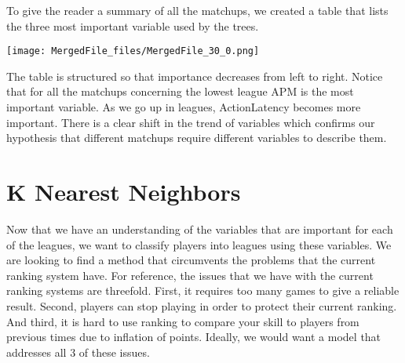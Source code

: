 \documentclass[letterpaper,10pt,english]{/usr/share/sphinx/texinputs/sphinxhowto}
\newenvironment{InvisibleVerbatim}
        {\begin{mdframed}[leftmargin=0.1\linewidth,innerleftmargin=3pt,innerrightmargin=3pt, userdefinedwidth=1\linewidth, linewidth=0pt, linecolor=white, usetwoside=false]}
        {\end{mdframed}}
\begin{document}
To give the reader a summary of all the matchups, we created a table
that lists the three most important variable used by the trees.

    

        
        

            
                \begin{InvisibleVerbatim}
                \vspace{-0.5\baselineskip}
    \begin{center}
    \texttt{[image: MergedFile\_files/MergedFile\_30\_0.png]}
    \par
    \end{center}
    
            \end{InvisibleVerbatim}
            
        
    
The table is structured so that importance decreases from left to right.
Notice that for all the matchups concerning the lowest league APM is the
most important variable. As we go up in leagues, ActionLatency becomes
more important. There is a clear shift in the trend of variables which
confirms our hypothesis that different matchups require different
variables to describe them.\part{K Nearest Neighbors}Now that we have an understanding of the variables that are important
for each of the leagues, we want to classify players into leagues using
these variables. We are looking to find a method that circumvents the
problems that the current ranking system have. For reference, the issues
that we have with the current ranking systems are threefold. First, it
requires too many games to give a reliable result. Second, players can
stop playing in order to protect their current ranking. And third, it is
hard to use ranking to compare your skill to players from previous times
due to inflation of points. Ideally, we would want a model that
addresses all 3 of these issues.
\end{document}

